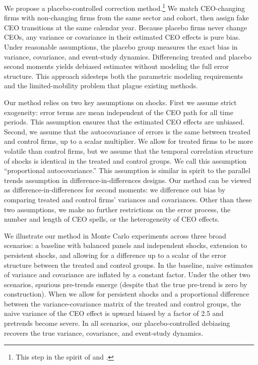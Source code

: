 \documentclass[11pt,a4paper]{article}
\begin{document}

We propose a placebo-controlled correction method.\footnote{This step in the spirit of \cite{fitza2014use} and \cite{jarosiewicz2023revisiting}.} We match CEO-changing firms with non-changing firms from the same sector and cohort, then assign fake CEO transitions at the same calendar year. Because placebo firms never change CEOs, any variance or covariance in their estimated CEO effects is pure bias. Under reasonable assumptions, the placebo group measures the exact bias in variance, covariance, and event-study dynamics. Differencing treated and placebo second moments yields debiased estimates without modeling the full error structure. This approach sidesteps both the parametric modeling requirements and the limited-mobility problem that plague existing methods.

Our method relies on two key assumptions on shocks. First we assume strict exogeneity: error terms are mean independent of the CEO path for all time periods. This assumption ensures that the estimated CEO effects are unbiased. Second, we assume that the autocovariance of errors is the same between treated and control firms, up to a scalar multiplier. We allow for treated firms to be more volatile than control firms, but we assume that the temporal correlation structure of shocks is identical in the treated and control groups. We call this assumption ``proportional autocovariance.'' This assumption is similar in spirit to the parallel trends assumption in difference-in-differences designs. Our method can be viewed as difference-in-differences for second moments: we difference out bias by comparing treated and control firms' variances and covariances. Other than these two assumptions, we make no further restrictions on the error process, the number and length of CEO spells, or the heterogeneity of CEO effects. 

We illustrate our method in Monte Carlo experiments across three broad scenarios: a baseline with balanced panels and independent shocks, extension to persistent shocks, and allowing for a difference up to a scalar of the error structure between the treated and control groups. In the baseline, naive estimates of variance and covariance are inflated by a constant factor. Under the other two scenarios, spurious pre-trends emerge (despite that the true pre-trend is zero by construction). When we allow for persistent shocks and a proportional difference between the variance-covariance matrix of the treated and control groups, the naive variance of the CEO effect is upward biased by a factor of 2.5 and pretrends become severe. In all scenarios, our placebo-controlled debiasing recovers the true variance, covariance, and event-study dynamics.
\end{document}
